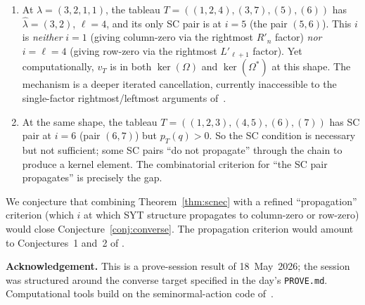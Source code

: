\documentclass[11pt]{article}
\theoremstyle{definition}
\newcommand{\Om}{\Omega}
\newcommand{\Omstar}{\Omega^{\ast}}
\newcommand{\hatl}{\widehat\lambda}
\newcommand{\Rp}{{R'}}
\newcommand{\Lp}{{L'}}
\newcommand{\pT}{p_T}
\begin{document}
\begin{enumerate}[topsep=0.2em,itemsep=0.2em]
\item At $\lambda = (3, 2, 1, 1)$, the tableau
   $T = ((1,2,4),(3,7),(5),(6))$ has $\hatl = (3, 2)$, $\ell = 4$, and
   its only SC pair is at $i = 5$ (the pair $(5, 6)$). This $i$ is
   \emph{neither} $i = 1$ (giving column-zero via the rightmost
   $\Rp_n$ factor) \emph{nor} $i = \ell = 4$ (giving row-zero via the
   rightmost $\Lp_{\ell+1}$ factor). Yet computationally, $v_T$ is
   in both $\ker(\Om)$ and $\ker(\Omstar)$ at this shape. The
   mechanism is a deeper iterated cancellation, currently
   inaccessible to the single-factor rightmost/leftmost arguments
   of~\cite[Props 3, 4]{dclassRowZero}.

\item At the same shape, the tableau $T = ((1,2,3),(4,5),(6),(7))$
   has SC pair at $i = 6$ (pair $(6, 7)$) but $\pT(q) > 0$. So the
   SC condition is necessary but not sufficient; some SC pairs
   ``do not propagate'' through the chain to produce a kernel
   element. The combinatorial criterion for ``the SC pair
   propagates'' is precisely the gap.
\end{enumerate}

We conjecture that combining Theorem~\ref{thm:scnec} with a refined
``propagation'' criterion (which $i$ at which SYT structure propagates
to column-zero or row-zero) would close Conjecture~\ref{conj:converse}.
The propagation criterion would amount to Conjectures~1 and~2 of
\cite{dclassRowZero}.

\bigskip\noindent\textbf{Acknowledgement.} This is a prove-session result
of 18~May~2026; the session was structured around the converse target
specified in the day's \texttt{PROVE.md}. Computational tools build on
the seminormal-action code of~\cite{convPerSyt}.
\end{document}
